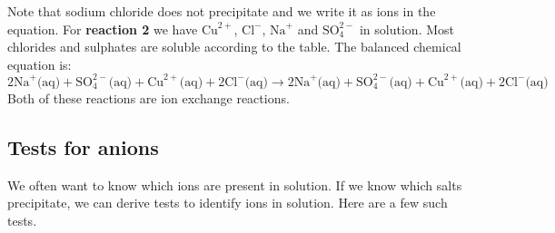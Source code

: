Note that sodium chloride does not precipitate and we write it as ions in the equation.
For \textbf{reaction 2} we have ${\text{Cu}}^{2+}$, ${\text{Cl}}^{-}$, ${\text{Na}}^{+}$ and $\text{SO}_{4}^{2-}$ in solution. Most chlorides and sulphates are soluble according to the table. The balanced chemical equation is: 
\begin{equation*}
2{\text{Na}}^{+} \text{(aq)} + \text{SO}_{4}^{2-} \text{(aq)} + {\text{Cu}}^{2+} \text{(aq)} + 2{\text{Cl}}^{-} \text{(aq)} \to 2{\text{Na}}^{+} \text{(aq)} + \text{SO}_{4}^{2-} \text{(aq)} + {\text{Cu}}^{2+} \text{(aq)} + 2{\text{Cl}}^{-} \text{(aq)} 
\end{equation*}
Both of these reactions are ion exchange reactions.
\subsection*{Tests for anions}
We often want to know which ions are present in solution. If we know which salts precipitate, we can derive tests to identify ions in solution. Here are a few such tests.
      \label{m38719*uid70}
